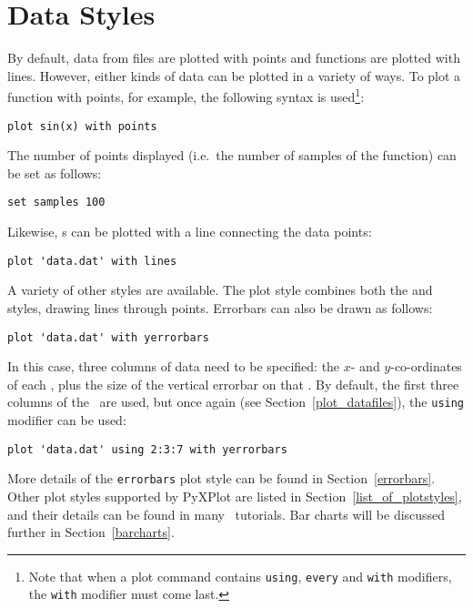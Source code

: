 \section{Data Styles}

By default, data from files are plotted with points and functions are plotted
with lines. However, either kinds of data can be plotted in a variety of ways.
To plot a function with points, for example, the following syntax is
used\footnote{Note that when a plot command contains {\tt using}, {\tt every}
and {\tt with} modifiers, the {\tt with} modifier must come
last.}:

\begin{verbatim}
plot sin(x) with points
\end{verbatim}

\noindent The number of points displayed (i.e.\ the number of samples of the
function) can be set as follows:

\begin{verbatim}
set samples 100
\end{verbatim}

\noindent Likewise, \datafile s can be plotted with a line connecting the data
points:

\begin{verbatim}
plot 'data.dat' with lines
\end{verbatim}

A variety of other styles are available. The  plot style
combines both the  and  styles, drawing lines
through points. Errorbars can also be drawn as follows:

\begin{verbatim}
plot 'data.dat' with yerrorbars
\end{verbatim}

\noindent In this case, three columns of data need to be specified: the $x$-
and $y$-co-ordinates of each \datapoint, plus the size of the vertical errorbar
on that \datapoint. By default, the first three columns of the \datafile\ are
used, but once again (see Section~\ref{plot_datafiles}), the {\tt using}
modifier can be used:

\begin{verbatim}
plot 'data.dat' using 2:3:7 with yerrorbars
\end{verbatim}

More details of the {\tt errorbars} plot style can be found in
Section~\ref{errorbars}. Other plot styles supported by PyXPlot are listed in
Section~\ref{list_of_plotstyles}, and their details can be found in many
\gnuplot\ tutorials. Bar charts will be discussed further in
Section~\ref{barcharts}.

